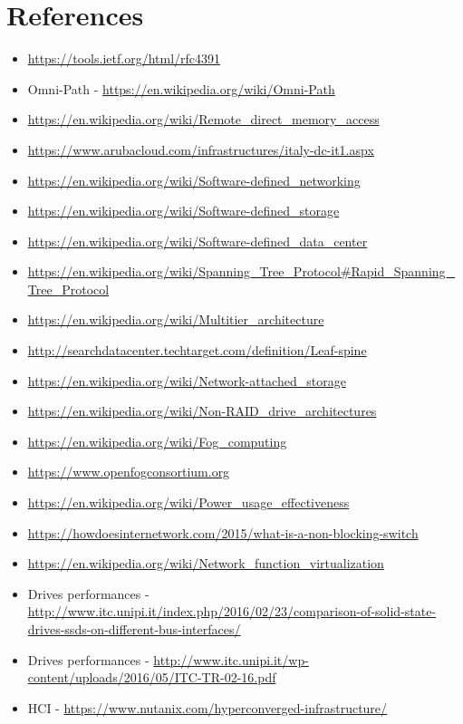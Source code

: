 \hypertarget{references}{%
\section{References}\label{references}}

\begin{itemize}
\item
  \url{https://tools.ietf.org/html/rfc4391}
\item
  Omni-Path - \url{https://en.wikipedia.org/wiki/Omni-Path}
\item
  \url{https://en.wikipedia.org/wiki/Remote_direct_memory_access}
\item
  \url{https://www.arubacloud.com/infrastructures/italy-dc-it1.aspx}
\item
  \url{https://en.wikipedia.org/wiki/Software-defined_networking}
\item
  \url{https://en.wikipedia.org/wiki/Software-defined_storage}
\item
  \url{https://en.wikipedia.org/wiki/Software-defined_data_center}
\item
  \url{https://en.wikipedia.org/wiki/Spanning_Tree_Protocol\#Rapid_Spanning_Tree_Protocol}
\item
  \url{https://en.wikipedia.org/wiki/Multitier_architecture}
\item
  \url{http://searchdatacenter.techtarget.com/definition/Leaf-spine}
\item
  \url{https://en.wikipedia.org/wiki/Network-attached_storage}
\item
  \url{https://en.wikipedia.org/wiki/Non-RAID_drive_architectures}
\item
  \url{https://en.wikipedia.org/wiki/Fog_computing}
\item
  \url{https://www.openfogconsortium.org}
\item
  \url{https://en.wikipedia.org/wiki/Power_usage_effectiveness}
\item
  \url{https://howdoesinternetwork.com/2015/what-is-a-non-blocking-switch}
\item
  \url{https://en.wikipedia.org/wiki/Network_function_virtualization}
\item
  Drives performances -
  \url{http://www.itc.unipi.it/index.php/2016/02/23/comparison-of-solid-state-drives-ssds-on-different-bus-interfaces/}
\item
  Drives performances -
  \url{http://www.itc.unipi.it/wp-content/uploads/2016/05/ITC-TR-02-16.pdf}
\item
  HCI - \url{https://www.nutanix.com/hyperconverged-infrastructure/}

\end{itemize}
